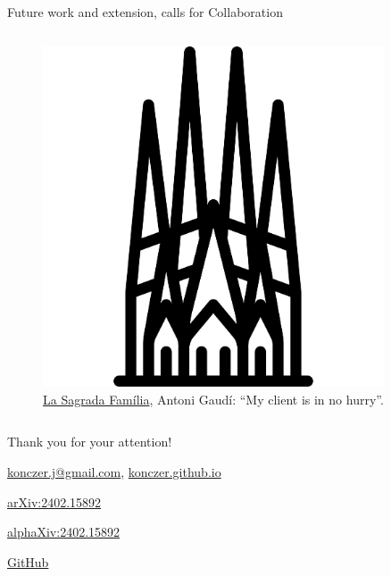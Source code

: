 \documentclass{beamer}
\theoremstyle{definition}
\begin{document}
\begin{frame}[shrink=15]{Future work and extension, calls for Collaboration}
\begin{columns}
\begin{column}{0.3\textwidth}
    \begin{figure}
    \centering
        \includegraphics[width=0.9\textwidth]{img/logos/SagradaFamilia.pdf}
        \caption{\small \centering  \href{https://boutique.arte.tv/detail/sagrada-familia-le-defi-de-gaudi}{La Sagrada Família}, Antoni Gaudí: ``My client is in no hurry''.}
    \end{figure}
\end{column}
        

\end{columns}

\end{frame}


\begin{frame}{}

\centering \Huge
  {Thank you for your attention!}

    \vspace{0.85 cm}
    

    \vspace{0.85 cm}

    {\large
  \href{mailto:konczer.j@gmail.com}{konczer.j@gmail.com},
        \href{https://konczer.github.io/}{konczer.github.io}
        
        \vspace{0.3 cm}
        
        \href{https://arxiv.org/abs/2402.15892}{arXiv:2402.15892}
        
        \href{https://www.alphaxiv.org/abs/2402.15892}{alphaXiv:2402.15892}

        \href{https://github.com/Konczer/UncertaintyTheory/tree/main/StatisticalGames}{GitHub}
     }   
  
\end{frame}
\end{document}
